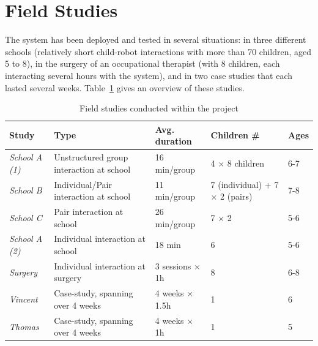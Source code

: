 \documentclass{article}
\begin{document}
\section{Field Studies}

The system has been deployed and tested in several situations: in three
different schools (relatively short child-robot interactions with
more than 70 children, aged 5 to 8), in the surgery of an occupational
therapist (with 8 children, each interacting several hours with the system),
and in two case studies that each lasted several weeks. Table~\ref{studies}
gives an overview of these studies.

\begin{table}[ht!]
\centering
\caption{\small Field studies conducted within the project}
\label{studies}
\footnotesize
\begin{tabular}{@{}lp{4cm}p{2.2cm}p{2cm}l@{}}
\toprule
{\bf Study}        & {\bf Type}                               & {\bf Avg. duration}    & {\bf Children \#}                     & {\bf Ages} \\ \midrule
{\it School A (1)} & Unstructured group interaction at school & 16 min/group           & 4 $\times$ 8 children                 & 6-7        \\
{\it School B}     & Individual/Pair interaction at school    & 11 min/group           & 7 (individual) + 7 $\times$ 2 (pairs) & 7-8        \\
{\it School C}     & Pair interaction at school               & 26 min/group           & 7 $\times$ 2                          & 5-6        \\
{\it School A (2)} & Individual interaction at school         & 18 min                 & 6                                     & 5-6        \\ \midrule
{\it Surgery}      & Individual interaction at surgery        & 3 sessions $\times$ 1h & 8                                     & 6-8        \\ \midrule 
{\it Vincent}      & Case-study, spanning over 4 weeks        & 4 weeks $\times$ 1.5h  & 1                                     & 6          \\
{\it Thomas}       & Case-study, spanning over 4 weeks        & 4 weeks $\times$ 1h    & 1                                     & 5          \\ \bottomrule
\end{tabular}
\end{table}
\end{document}
